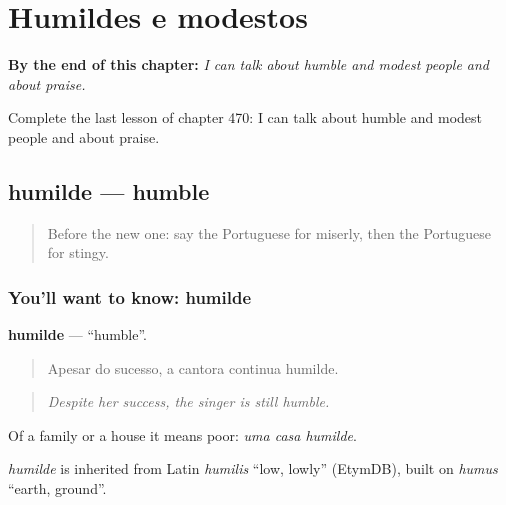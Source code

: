 
\chapter{Humildes e modestos}
\label{ch:pt-humildes-e-modestos}

\begin{chapteropening}
\textbf{By the end of this chapter:} \emph{I can talk about humble and modest people and about praise.}

Complete the last lesson of chapter 470: I can talk about humble and modest people and about praise.
\end{chapteropening}

\section[humilde]{humilde — humble}

\label{lesson:PT-C470-humilde}



\begin{quote}
Before the new one: say the Portuguese for miserly, then the Portuguese for stingy.
\end{quote}

\subsection*{You'll want to know: humilde}
\textbf{humilde} — \textquotedblleft{}humble\textquotedblright{}.

\begin{quote}
Apesar do sucesso, a cantora continua humilde.
\end{quote}

\begin{quote}
\emph{Despite her success, the singer is still humble.}
\end{quote}

Of a family or a house it means poor: \emph{uma casa humilde}.

\begin{cousinweb}
\emph{humilde} is inherited from Latin \emph{humilis} \textquotedblleft{}low, lowly\textquotedblright{} (EtymDB), built on \emph{humus} \textquotedblleft{}earth, ground\textquotedblright{}.
\end{cousinweb}

